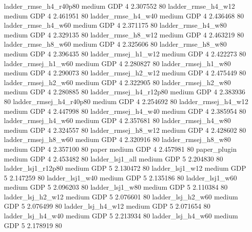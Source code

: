  ladder_rmse_h4_r40p80     medium      GDP                 4 2.307552 80
    ladder_rmse_h4_w12     medium      GDP                 4 2.461951 80
    ladder_rmse_h4_w40     medium      GDP                 4 2.436468 80
    ladder_rmse_h4_w60     medium      GDP                 4 2.371175 80
    ladder_rmse_h4_w80     medium      GDP                 4 2.329135 80
    ladder_rmse_h8_w12     medium      GDP                 4 2.463219 80
    ladder_rmse_h8_w60     medium      GDP                 4 2.325606 80
    ladder_rmse_h8_w80     medium      GDP                 4 2.396435 80
   ladder_rmsej_h1_w12     medium      GDP                 4 2.422273 80
   ladder_rmsej_h1_w60     medium      GDP                 4 2.280827 80
   ladder_rmsej_h1_w80     medium      GDP                 4 2.290073 80
   ladder_rmsej_h2_w12     medium      GDP                 4 2.475449 80
   ladder_rmsej_h2_w60     medium      GDP                 4 2.322905 80
   ladder_rmsej_h2_w80     medium      GDP                 4 2.280885 80
ladder_rmsej_h4_r12p80     medium      GDP                 4 2.383936 80
ladder_rmsej_h4_r40p80     medium      GDP                 4 2.254692 80
   ladder_rmsej_h4_w12     medium      GDP                 4 2.447998 80
   ladder_rmsej_h4_w40     medium      GDP                 4 2.385954 80
   ladder_rmsej_h4_w60     medium      GDP                 4 2.357681 80
   ladder_rmsej_h4_w80     medium      GDP                 4 2.324557 80
   ladder_rmsej_h8_w12     medium      GDP                 4 2.428602 80
   ladder_rmsej_h8_w60     medium      GDP                 4 2.320916 80
   ladder_rmsej_h8_w80     medium      GDP                 4 2.357100 80
                 paper     medium      GDP                 4 2.457981 80
          paper_plugin     medium      GDP                 4 2.453482 80
       ladder_lsj1_all     medium      GDP                 5 2.204830 80
    ladder_lsj1_r12p80     medium      GDP                 5 2.130472 80
       ladder_lsj1_w12     medium      GDP                 5 2.147259 80
       ladder_lsj1_w40     medium      GDP                 5 2.135186 80
       ladder_lsj1_w60     medium      GDP                 5 2.096203 80
       ladder_lsj1_w80     medium      GDP                 5 2.110384 80
     ladder_lsj_h2_w12     medium      GDP                 5 2.076601 80
     ladder_lsj_h2_w60     medium      GDP                 5 2.076499 80
     ladder_lsj_h4_w12     medium      GDP                 5 2.071654 80
     ladder_lsj_h4_w40     medium      GDP                 5 2.213934 80
     ladder_lsj_h4_w60     medium      GDP                 5 2.178919 80
